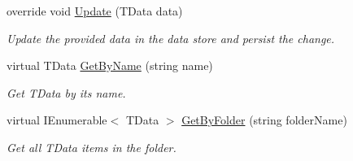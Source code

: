 \begin{DoxyCompactItemize}
override void \hyperlink{classCqrs_1_1Azure_1_1BlobStorage_1_1BlobStorageStore_a03be976aded454866b4589de99a9e1c8_a03be976aded454866b4589de99a9e1c8}{Update} (T\+Data data)
\begin{DoxyCompactList}\small\item\em Update the provided {\itshape data}  in the data store and persist the change. \end{DoxyCompactList}\item 
virtual T\+Data \hyperlink{classCqrs_1_1Azure_1_1BlobStorage_1_1BlobStorageStore_a16464b2b12056d0d270b8657b6c9e1e6_a16464b2b12056d0d270b8657b6c9e1e6}{Get\+By\+Name} (string name)
\begin{DoxyCompactList}\small\item\em Get {\itshape T\+Data}  by its name. \end{DoxyCompactList}\item 
virtual I\+Enumerable$<$ T\+Data $>$ \hyperlink{classCqrs_1_1Azure_1_1BlobStorage_1_1BlobStorageStore_a96064e01ccf12413582acd7497f3802d_a96064e01ccf12413582acd7497f3802d}{Get\+By\+Folder} (string folder\+Name)
\begin{DoxyCompactList}\small\item\em Get all {\itshape T\+Data}  items in the folder. \end{DoxyCompactList}\end{DoxyCompactItemize}
